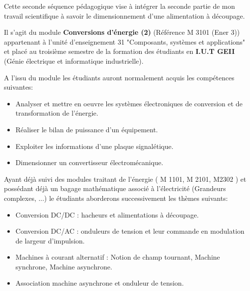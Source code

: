 \documentclass[12pt]{article}
\begin{document}
Cette seconde séquence pédagogique vise à intégrer la seconde partie de mon travail scientifique à savoir le dimensionnement d'une alimentation à découpage.\par

\vspace{10pt}

Il s'agit du module \textbf{Conversions d'énergie (2)} (Référence M 3101 (Ener 3)) appartenant à l'unité d'enseignement 31 "Composants, systèmes et applications" et placé au troisième semestre de la formation des étudiants en \textbf{I.U.T GEII} (Génie électrique et informatique industrielle). \par

\vspace{10pt}
\par
\vspace{10pt}

A l'issu du module les étudiants auront normalement acquis les compétences suivantes:\par
\vspace{10pt}

\begin{itemize}
\item Analyser et mettre en oeuvre les systèmes électroniques de conversion et de transformation de l'énergie.
\item Réaliser le bilan de puissance d'un équipement.
\item Exploiter les informations d'une plaque signalétique. 
\item Dimensionner un convertisseur électromécanique.
\end{itemize}

\vspace{10pt}

Ayant déjà suivi des modules traitant de l'énergie ( M 1101, M 2101, M2302 ) et possédant déjà un bagage mathématique associé à l'électricité (Grandeurs complexes, ...) le étudiants aborderons successivement les thèmes suivants:\par
\vspace{10pt}

\begin{itemize}
\item Conversion DC/DC : hacheurs et alimentations à découpage.
\item Conversion DC/AC : onduleurs de tension et leur commande en modulation de largeur d'impulsion.
\item Machines à courant alternatif : Notion de champ tournant, Machine synchrone, Machine asynchrone.
\item Association machine asynchrone et onduleur de tension.
\end{itemize}
\end{document}
